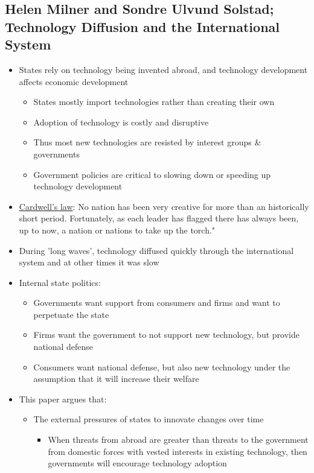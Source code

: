 \documentclass[11pt]{article}
\begin{document}
\subsection{Helen Milner and Sondre Ulvund Solstad; Technology Diffusion and the International System}
\label{sec:org97c20ad}
\begin{itemize}
\item States rely on technology being invented abroad, and technology development
affects economic development
\begin{itemize}
\item States mostly import technologies rather than creating their own
\item Adoption of technology is costly and disruptive
\item Thus most new technologies are resisted by interest groups \& governments
\item Government policies are critical to slowing down or speeding up technology development
\end{itemize}
\item \href{Cardwell's Law.org}{Cardwell's law}: No nation has been very creative for more than an historically
short period. Fortunately, as each leader has flagged there has always been,
up to now, a nation or nations to take up the torch."
\item During 'long waves', technology diffused quickly through the international
system and at other times it was slow
\item Internal state politics:
\begin{itemize}
\item Governments want support from consumers and firms and want to perpetuate the state
\item Firms want the government to not support new technology, but provide
national defense
\item Consumers want national defense, but also new technology under the
assumption that it will increase their welfare
\end{itemize}
\item This paper argues that:
\begin{itemize}
\item The external pressures of states to innovate changes over time
\begin{itemize}
\item When threats from abroad are greater than threats to the government from
domestic forces with vested interests in existing technology, then
governments will encourage technology adoption

\end{itemize}
\end{itemize}
\end{itemize}
\end{document}
